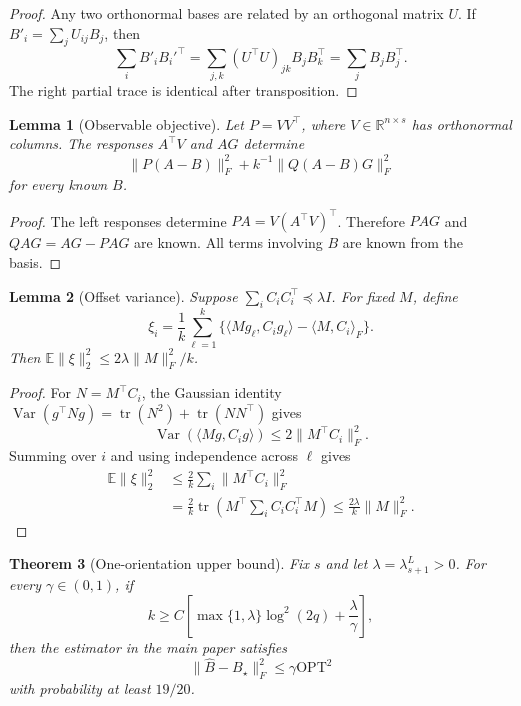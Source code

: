 \documentclass[twoside]{article}
\newtheorem{theorem}{Theorem}
\newtheorem{lemma}[theorem]{Lemma}
\newcommand{\E}{\mathbb E}
\newcommand{\R}{\mathbb R}
\newcommand{\Var}{\operatorname{Var}}
\newcommand{\tr}{\operatorname{tr}}
\newcommand{\OPT}{\mathrm{OPT}}
\begin{document}
\begin{proof}
Any two orthonormal bases are related by an orthogonal matrix $U$. If
$B'_i=\sum_jU_{ij}B_j$, then
\[
 \sum_iB'_iB_i'^\top
 =\sum_{j,k}(U^\top U)_{jk}B_jB_k^\top
 =\sum_jB_jB_j^\top.
\]
The right partial trace is identical after transposition.
\end{proof}

\begin{lemma}[Observable objective]
\label{lem:observable}
Let $P=VV^\top$, where $V\in\R^{n\times s}$ has orthonormal columns. The
responses $A^\top V$ and $AG$ determine
\[
 \|P(A-B)\|_F^2+k^{-1}\|Q(A-B)G\|_F^2
\]
for every known $B$.
\end{lemma}

\begin{proof}
The left responses determine
$PA=V(A^\top V)^\top$. Therefore $PAG$ and
$QAG=AG-PAG$ are known. All terms involving $B$ are known from the basis.
\end{proof}

\begin{lemma}[Offset variance]
\label{lem:app-offset}
Suppose $\sum_iC_iC_i^\top\preceq\lambda I$. For fixed $M$, define
\[
 \xi_i=\frac1k\sum_{\ell=1}^k
 \{\langle Mg_\ell,C_ig_\ell\rangle-\langle M,C_i\rangle_F\}.
\]
Then $\E\|\xi\|_2^2\le2\lambda\|M\|_F^2/k$.
\end{lemma}

\begin{proof}
For $N=M^\top C_i$, the Gaussian identity
$\Var(g^\top Ng)=\tr(N^2)+\tr(NN^\top)$ gives
\[
 \Var(\langle Mg,C_ig\rangle)\le2\|M^\top C_i\|_F^2.
\]
Summing over $i$ and using independence across $\ell$ gives
\begin{align*}
 \E\|\xi\|_2^2
 &\le\frac2k\sum_i\|M^\top C_i\|_F^2\\
 &=\frac2k\tr\left(M^\top\sum_iC_iC_i^\top M\right)
 \le\frac{2\lambda}{k}\|M\|_F^2.
\end{align*}
\end{proof}

\begin{theorem}[One-orientation upper bound]
\label{thm:app-upper}
Fix $s$ and let $\lambda=\lambda_{s+1}^L>0$. For every
$\gamma\in(0,1)$, if
\begin{equation}
 k\ge C\left[
 \max\{1,\lambda\}\log^2(2q)+\frac{\lambda}{\gamma}
 \right],
 \label{eq:app-upper-k}
\end{equation}
then the estimator in the main paper satisfies
\begin{equation}
 \|\widehat B-B_\star\|_F^2\le\gamma\OPT^2
 \label{eq:parameter-target}
\end{equation}
with probability at least $19/20$.
\end{theorem}
\end{document}
